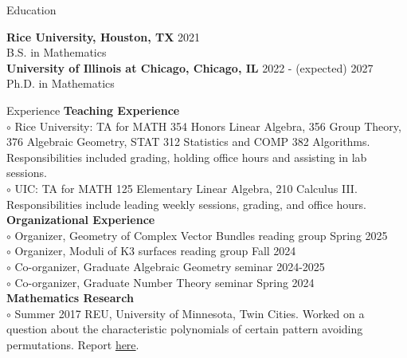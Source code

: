 \documentclass[
	12pt, %
]{resume} %
\begin{document}

\begin{rSection}{Education}
	
    \textbf{Rice University, Houston, TX} \hfill 2021\\
    B.S. in Mathematics\\
	\textbf{University of Illinois at Chicago, Chicago, IL} \hfill 2022 - (expected) 2027\\
    Ph.D. in Mathematics
\end{rSection}


\begin{rSection}{Experience}
    \textbf{Teaching Experience}\\
    $\circ$ Rice University: TA for MATH 354 Honors Linear Algebra, 356 Group Theory, 376 Algebraic Geometry, STAT 312 Statistics and COMP 382 Algorithms. Responsibilities included grading, holding office hours and assisting in lab sessions.\\
    $\circ$ UIC: TA for MATH 125 Elementary Linear Algebra, 210 Calculus III. Responsibilities include leading weekly sessions, grading, and office hours.\\
    \textbf{Organizational Experience}\\
    $\circ$ Organizer, Geometry of Complex Vector Bundles reading group \hfill Spring 2025\\
    $\circ$ Organizer, Moduli of K3 surfaces reading group \hfill Fall 2024\\
    $\circ$ Co-organizer, Graduate Algebraic Geometry seminar \hfill 2024-2025\\
    $\circ$ Co-organizer, Graduate Number Theory seminar \hfill Spring 2024\\
    \textbf{Mathematics Research}\\
    $\circ$ Summer 2017 REU, University of Minnesota, Twin Cities. Worked on a question about the characteristic polynomials of certain pattern avoiding permutations. Report \href{http://www-users.math.umn.edu/~reiner/REU/GaetzHardtSridharTran_prob8_2017.pdf}{here}. 
\end{rSection}
\end{document}
